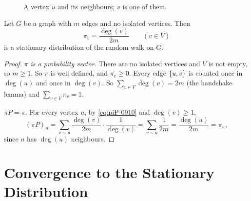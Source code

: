 \begin{figure}[ht]
    \centering
    \caption{A vertex $u$ and its neighbours; $v$ is one of them.}
    \label{fig:star-0910}
\end{figure}

\begin{theorem}\label{thm:stationary-0910}
    Let $G$ be a graph with $m$ edges and no isolated vertices. Then
    \[\pi_v = \frac{\deg(v)}{2m} \qquad (v \in V)\]
    is a stationary distribution of the random walk on $G$.
\end{theorem}

\begin{proof}
    \emph{$\pi$ is a probability vector.} There are no isolated vertices and $V$ is not empty, so
    $m \geq 1$. So $\pi$ is well defined, and $\pi_v \geq 0$. Every edge $\left\lbrace u,v\right\rbrace$ is counted
    once in $\deg(u)$ and once in $\deg(v)$. So $\sum_{v \in V} \deg(v) = 2m$ (the handshake lemma)
    and $\sum_{v \in V} \pi_v = 1$.

    \emph{$\pi P = \pi$.} For every vertex $u$, by \cref{eq:piP-0910} and $\deg(v) \geq 1$,
    \[(\pi P)_u = \sum_{v \sim u} \frac{\deg(v)}{2m} \cdot \frac{1}{\deg(v)} = \sum_{v \sim u} \frac{1}{2m}
        = \frac{\deg(u)}{2m} = \pi_u,\]
    since $u$ has $\deg(u)$ neighbours.
\end{proof}


\section{Convergence to the Stationary Distribution}

